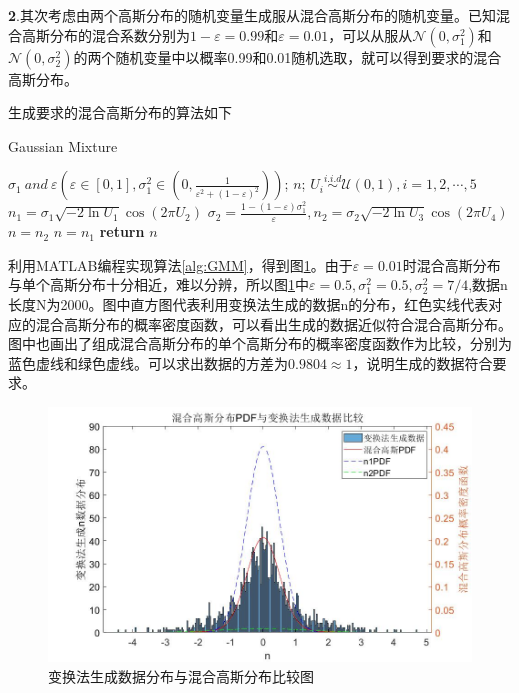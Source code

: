 \documentclass[fontset=windows]{article}
\numberwithin{figure}{section}
\begin{document}
\textbf{2}.其次考虑由两个高斯分布的随机变量生成服从混合高斯分布的随机变量。已知混合高斯分布的混合系数分别为\(1-\varepsilon=0.99\)和\(\varepsilon=0.01\)，可以从服从\(\mathcal{N}(0,\sigma^2_1)\)和\(\mathcal{N}(0,\sigma^2_2)\)的两个随机变量中以概率0.99和0.01随机选取，就可以得到要求的混合高斯分布。

生成要求的混合高斯分布的算法如下
\begin{algorithm}[H]
	\caption{Gaussian Mixture}
	\label{alg:GMM}
	\begin{algorithmic}[1]
		\REQUIRE \(\sigma_1\ and\ \varepsilon(\varepsilon\in [0,1],\sigma^2_1\in (0,\frac{1}{\varepsilon^2+(1-\varepsilon)^2}))\);
		\ENSURE \(n\);
		\STATE \(U_i\overset{i.i.d}{\sim} \mathcal{U}(0,1),i=1,2,\cdots,5\)
		\STATE \(n_1=\sigma_1\sqrt{-2\ln U_1}\cos(2\pi U_2)\)
		\STATE \(\sigma_2=\frac{1-(1-\varepsilon)\sigma^2_1}{\varepsilon},n_2=\sigma_2\sqrt{-2\ln U_3}\cos(2\pi U_4)\)
		\STATE \(n=n_2\)
		\ELSE
		\STATE \(n=n_1\)
		\ENDIF
		\STATE \textbf{return} \(n\)
	\end{algorithmic}
\end{algorithm}

利用MATLAB编程实现算法\ref*{alg:GMM}，得到图\ref*{fig:3}。由于\(\varepsilon=0.01\)时混合高斯分布与单个高斯分布十分相近，难以分辨，所以图\ref*{fig:3}中\(\varepsilon=0.5,\sigma_1^2=0.5,\sigma^2_2=7/4\),数据n长度N为2000。图中直方图代表利用变换法生成的数据n的分布，红色实线代表对应的混合高斯分布的概率密度函数，可以看出生成的数据近似符合混合高斯分布。图中也画出了组成混合高斯分布的单个高斯分布的概率密度函数作为比较，分别为蓝色虚线和绿色虚线。可以求出数据的方差为\(0.9804\approx1\)，说明生成的数据符合要求。

\begin{figure}[H]
	\centering
	\includegraphics[scale=0.4]{5.jpg}
	\caption{变换法生成数据分布与混合高斯分布比较图}
	\label{fig:3}
\end{figure}
\end{document}
